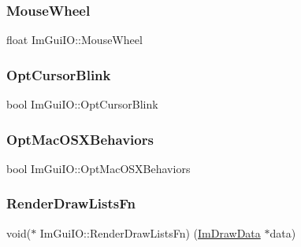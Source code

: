 \subsubsection{\texorpdfstring{Mouse\+Wheel}{MouseWheel}}
{\footnotesize\ttfamily float Im\+Gui\+I\+O\+::\+Mouse\+Wheel}

\hypertarget{struct_im_gui_i_o_a676ccbf84e205effc5a023e8d5adc6eb}{}\label{struct_im_gui_i_o_a676ccbf84e205effc5a023e8d5adc6eb} 
\subsubsection{\texorpdfstring{Opt\+Cursor\+Blink}{OptCursorBlink}}
{\footnotesize\ttfamily bool Im\+Gui\+I\+O\+::\+Opt\+Cursor\+Blink}

\hypertarget{struct_im_gui_i_o_a99ffac55fc01f11166e8e92ca9ebda98}{}\label{struct_im_gui_i_o_a99ffac55fc01f11166e8e92ca9ebda98} 
\subsubsection{\texorpdfstring{Opt\+Mac\+O\+S\+X\+Behaviors}{OptMacOSXBehaviors}}
{\footnotesize\ttfamily bool Im\+Gui\+I\+O\+::\+Opt\+Mac\+O\+S\+X\+Behaviors}

\hypertarget{struct_im_gui_i_o_ae16a9f25f36fe9706d8a33fb128e538a}{}\label{struct_im_gui_i_o_ae16a9f25f36fe9706d8a33fb128e538a} 
\subsubsection{\texorpdfstring{Render\+Draw\+Lists\+Fn}{RenderDrawListsFn}}
{\footnotesize\ttfamily void($\ast$ Im\+Gui\+I\+O\+::\+Render\+Draw\+Lists\+Fn) (\hyperlink{struct_im_draw_data}{Im\+Draw\+Data} $\ast$data)}

\hypertarget{struct_im_gui_i_o_a1ee9c0763df33f7f3a9819235ce85078}{}\label{struct_im_gui_i_o_a1ee9c0763df33f7f3a9819235ce85078} 
